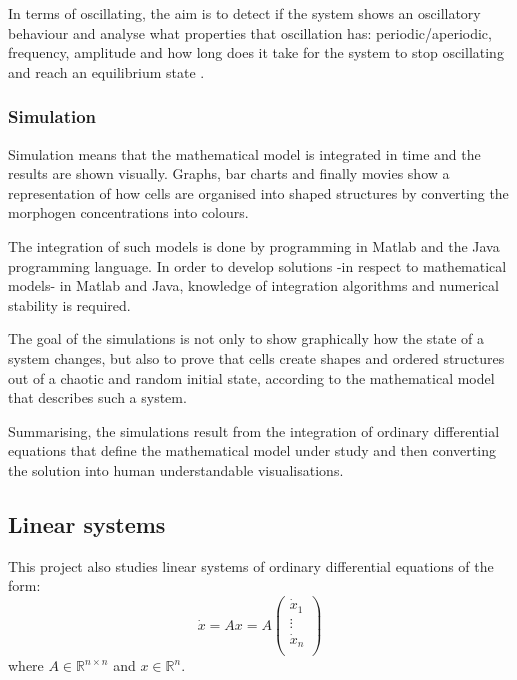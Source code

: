 In terms of oscillating, the aim is to detect if the system shows an oscillatory behaviour and analyse what properties that oscillation has: periodic/aperiodic, frequency, amplitude and how long does it take for the system to stop oscillating and reach an equilibrium state \cite[p. ~7]{aggarwal_notes_1972}.

\subsubsection{Simulation}
Simulation means that the mathematical model is integrated in time and the results are shown visually. Graphs, bar charts and finally movies show a representation of how cells are organised into shaped structures by converting the morphogen concentrations into colours.

The integration of such models is done by programming in Matlab and the Java programming language. In order to develop solutions -in respect to mathematical models- in Matlab and Java, knowledge of integration algorithms and numerical stability is required. 

The goal of the simulations is not only to show graphically how the state of a system changes, but also to prove that cells create shapes and ordered structures out of a chaotic and random initial state, according to the mathematical model that describes such a system.

Summarising, the simulations result from the integration of ordinary differential equations that define the mathematical model under study and then converting the solution into human understandable visualisations.

\subsection{Linear systems}
\label{linsys}
This project also studies linear systems of ordinary differential equations of the form:
$$ \dot{x} = Ax = A\begin{pmatrix}
            \dot{x}_1 \\
            \vdots \\
            \dot{x}_n \\
            \end{pmatrix}
$$
where $ A \in \mathbb{R}^{n \times n} $ and $ x \in \mathbb{R}^n$.

